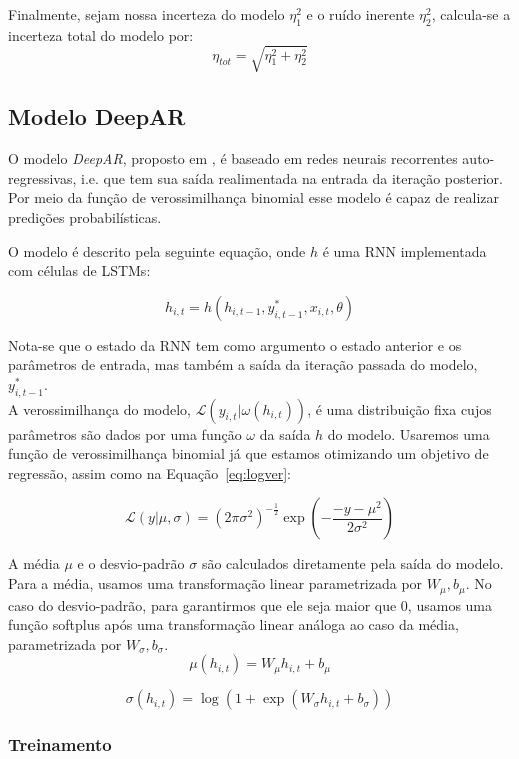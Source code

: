 Finalmente, sejam nossa incerteza do modelo $\eta_1^2$ e o ruído inerente
$\eta^2_2$, calcula-se a incerteza total do modelo por: \\

\[  \eta_{tot} = \sqrt{  \eta_1^2 + \eta_2^2 }  \]


\subsection{Modelo DeepAR}

O modelo \textit{DeepAR}, proposto em \cite{deepar}, é baseado em redes neurais recorrentes auto-regressivas,
i.e. que tem sua saída realimentada na entrada da iteração posterior. Por meio da função de verossimilhança binomial esse modelo é capaz
de realizar predições probabilísticas.

O modelo é descrito pela seguinte equação, onde $h$ é uma RNN implementada com células de LSTMs:

\[
h_{i,t} = h(h_{i,t-1},y^*_{i,t-1},x_{i,t}, \theta)
\]

Nota-se que o estado da RNN tem como argumento o estado anterior e os parâmetros de entrada, mas também a saída da iteração passada do modelo, $y^*_{i,t-1}$. \\

A verossimilhança do modelo, $\mathcal{L}(y_{i,t} | \omega(h_{i,t}))$, é uma distribuição fixa cujos parâmetros são dados por uma função $\omega$ da saída $h$ do modelo. Usaremos uma função de verossimilhança binomial já que estamos otimizando um objetivo de regressão, assim como na Equação~\ref{eq:logver}:

\[
\mathcal{L}(y | \mu,\sigma) = {(2\pi\sigma^2)}^{-\frac{1}{2}} \exp(-  \frac{-y - \mu^2}{2\sigma^2})  
\]

A média $\mu$ e o desvio-padrão $\sigma$ são calculados diretamente pela saída do modelo. Para a média, usamos uma transformação linear parametrizada por $W_{\mu},b_{\mu}$. No caso do desvio-padrão, para garantirmos que ele seja maior que 0, usamos uma função softplus após uma transformação linear análoga ao caso da média, parametrizada por  $W_{\sigma},b_{\sigma}$.\\

\[ \mu(h_{i,t}) = W_{\mu}h_{i,t} + b_{\mu} \]

\[ \sigma(h_{i,t}) = \log(1 + \exp(W_{\sigma}h_{i,t}+ b_{\sigma})) \]


\subsubsection{Treinamento}



